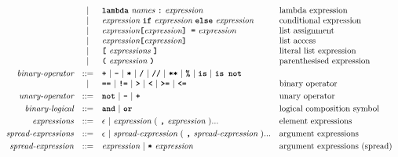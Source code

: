 \[\begin{array}{rcll}
                            & |   & \textbf{\texttt{lambda}}\ \textit{names}\ \textbf{\texttt{:}}\ \textit{expression}         & \text{lambda expression}                \\
                            & |   & \textit{expression}\ \textbf{\texttt{if}}\ \textit{expression}\ \textbf{\texttt{else}}\ \textit{expression}    & \text{conditional expression}           \\
                            & |   & \textit{expression}\textbf{\texttt{[}}\textit{expression}\textbf{\texttt{] =}}\ \textit{expression}            & \text{list assignment}                  \\
                            & |   & \textit{expression}\textbf{\texttt{[}}\textit{expression}\textbf{\texttt{]}}                                   & \text{list access}                      \\
                            & |   & \textbf{\texttt{[}}\ \textit{expressions}\ \textbf{\texttt{]}}                                                 & \text{literal list expression}          \\
                            & |   & \textbf{\texttt{(}}\ \textit{expression}\ \textbf{\texttt{)}}                                                  & \text{parenthesised expression}         \\[1mm]
\textit{binary-operator}    & ::= & \textbf{\texttt{+}}\ |\ \textbf{\texttt{-}}\ |\ \textbf{\texttt{*}}\ |\ \textbf{\texttt{/}}\ |\ \textbf{\texttt{//}}\ |\ \textbf{\texttt{**}}\ |\ \textbf{\texttt{\%}}\ |\ \textbf{\texttt{is}}\ |\ \textbf{\texttt{is not}} &                                         \\
                            & |   & \textbf{\texttt{==}}\ |\ \textbf{\texttt{!=}}\ |\ \textbf{\texttt{>}}\ |\ \textbf{\texttt{<}}\ |\ \textbf{\texttt{>=}}\ |\ \textbf{\texttt{<=}}            & \text{binary operator}                  \\[1mm]
\textit{unary-operator}     & ::= & \textbf{\texttt{not}}\ |\ \textbf{\texttt{-}}\ |\ \textbf{\texttt{+}}                                                     & \text{unary operator}                   \\[1mm]
\textit{binary-logical}     & ::= & \textbf{\texttt{and}}\ |\ \textbf{\texttt{or}}                                                                 & \text{logical composition symbol}       \\[1mm]
\textit{expressions}        & ::= & \epsilon\ |\ \textit{expression}\ (\ \textbf{\texttt{,}}\ \textit{expression}\ )...                 & \text{element expressions}              \\[1mm]
\textit{spread-expressions} & ::= & \epsilon\ |\ \textit{spread-expression}\ (\ \textbf{\texttt{,}}\ \textit{spread-expression}\ )...   & \text{argument expressions}             \\[1mm]
\textit{spread-expression}  & ::= & \textit{expression}\ |\ \textbf{\texttt{*}}\ \textit{expression}                                    & \text{argument expressions (spread)}    \\

\end{array}\]
